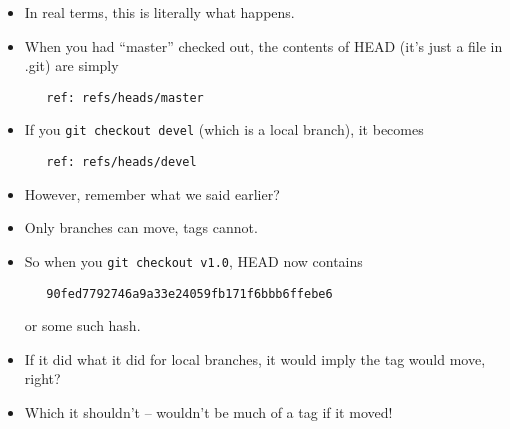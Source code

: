 \documentclass[presentation]{beamer}
\begin{document}
\begin{frame}[fragile]

\footnotesize
\begin{itemize}
\item In real terms, this is literally what happens.
\item When you had ``master'' checked
  out, the contents of HEAD (it's just a file in .git) are simply

\begin{verbatim}
   ref: refs/heads/master
\end{verbatim}
\item If you \texttt{git checkout devel} (which is a local branch), it becomes

\begin{verbatim}
   ref: refs/heads/devel
\end{verbatim}
\item However, remember what we said earlier?
\item Only branches can move, tags cannot.
\item So when you \texttt{git checkout v1.0}, HEAD now contains

\begin{verbatim}
   90fed7792746a9a33e24059fb171f6bbb6ffebe6
\end{verbatim}

  or some such hash.
\item If it did what it did for local branches, it would imply
  the tag would move, right?
\item Which it shouldn't -- wouldn't be much of a tag if
  it moved!
\end{itemize}
\end{frame}
\end{document}
